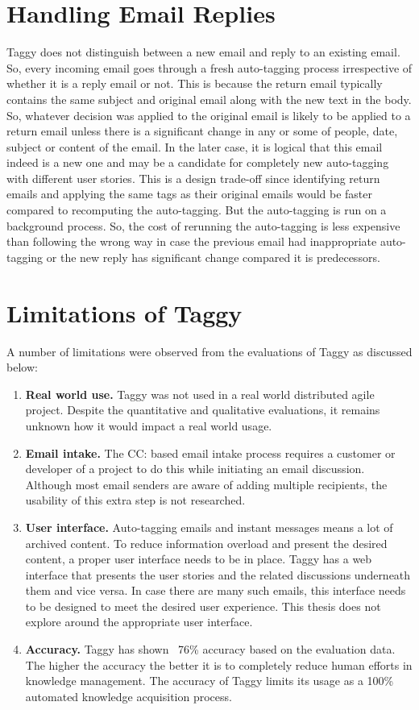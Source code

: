 \section{Handling Email Replies}
Taggy does not distinguish between a new email and reply to an existing email. So, every incoming email goes through a fresh auto-tagging process irrespective of whether it is a reply email or not. This is because the return email typically contains the same subject and original email along with the new text in the body. So, whatever decision was applied to the original email is likely to be applied to a return email unless there is a significant change in any or some of people, date, subject or content of the email. In the later case, it is logical that this email indeed is a new one and may be a candidate for completely new auto-tagging with different user stories. This is a design trade-off since identifying return emails and applying the same tags as their original emails would be faster compared to recomputing the auto-tagging. But the auto-tagging is run on a background process. So, the cost of rerunning the auto-tagging is less expensive than following the wrong way in case the previous email had inappropriate auto-tagging or the new reply has significant change compared it is predecessors.


\section{Limitations of Taggy}
A number of limitations were observed from the evaluations of Taggy as discussed below:

\begin{enumerate}
	\item \textbf{Real world use.} Taggy was not used in a real world distributed agile project. Despite the quantitative and qualitative evaluations, it remains unknown how it would impact a real world usage.
	\item \textbf{Email intake.} The CC: based email intake process requires a customer or developer of a project to do this while initiating an email discussion. Although most email senders are aware of adding multiple recipients, the usability of this extra step is not researched.
	\item \textbf{User interface.} Auto-tagging emails and instant messages means a lot of archived content. To reduce information overload and present the desired content, a proper user interface needs to be in place. Taggy has a web interface that presents the user stories and the related discussions underneath them and vice versa. In case there are many such emails, this interface needs to be designed to meet the desired user experience. This thesis does not explore around the appropriate user interface.
	\item \textbf{Accuracy.} Taggy has shown ~76\% accuracy based on the evaluation data. The higher the accuracy the better it is to completely reduce human efforts in knowledge management. The accuracy of Taggy limits its usage as a 100\% automated knowledge acquisition process.
\end{enumerate}







